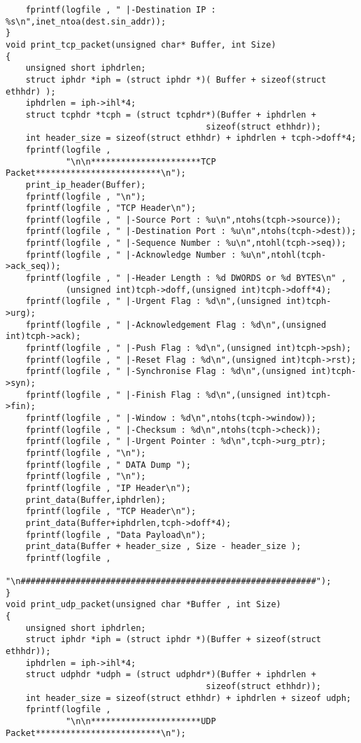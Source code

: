 \begin{verbatim}
    fprintf(logfile , " |-Destination IP : %s\n",inet_ntoa(dest.sin_addr));
}
void print_tcp_packet(unsigned char* Buffer, int Size)
{
    unsigned short iphdrlen;
    struct iphdr *iph = (struct iphdr *)( Buffer + sizeof(struct ethhdr) );
    iphdrlen = iph->ihl*4;
    struct tcphdr *tcph = (struct tcphdr*)(Buffer + iphdrlen + 
                                        sizeof(struct ethhdr));
    int header_size = sizeof(struct ethhdr) + iphdrlen + tcph->doff*4;
    fprintf(logfile , 
            "\n\n**********************TCP Packet*************************\n");
    print_ip_header(Buffer);
    fprintf(logfile , "\n");
    fprintf(logfile , "TCP Header\n");
    fprintf(logfile , " |-Source Port : %u\n",ntohs(tcph->source));
    fprintf(logfile , " |-Destination Port : %u\n",ntohs(tcph->dest));
    fprintf(logfile , " |-Sequence Number : %u\n",ntohl(tcph->seq));
    fprintf(logfile , " |-Acknowledge Number : %u\n",ntohl(tcph->ack_seq));
    fprintf(logfile , " |-Header Length : %d DWORDS or %d BYTES\n" ,
            (unsigned int)tcph->doff,(unsigned int)tcph->doff*4);
    fprintf(logfile , " |-Urgent Flag : %d\n",(unsigned int)tcph->urg);
    fprintf(logfile , " |-Acknowledgement Flag : %d\n",(unsigned int)tcph->ack);
    fprintf(logfile , " |-Push Flag : %d\n",(unsigned int)tcph->psh);
    fprintf(logfile , " |-Reset Flag : %d\n",(unsigned int)tcph->rst);
    fprintf(logfile , " |-Synchronise Flag : %d\n",(unsigned int)tcph->syn);
    fprintf(logfile , " |-Finish Flag : %d\n",(unsigned int)tcph->fin);
    fprintf(logfile , " |-Window : %d\n",ntohs(tcph->window));
    fprintf(logfile , " |-Checksum : %d\n",ntohs(tcph->check));
    fprintf(logfile , " |-Urgent Pointer : %d\n",tcph->urg_ptr);
    fprintf(logfile , "\n");
    fprintf(logfile , " DATA Dump ");
    fprintf(logfile , "\n");
    fprintf(logfile , "IP Header\n");
    print_data(Buffer,iphdrlen);
    fprintf(logfile , "TCP Header\n");
    print_data(Buffer+iphdrlen,tcph->doff*4);
    fprintf(logfile , "Data Payload\n");
    print_data(Buffer + header_size , Size - header_size );
    fprintf(logfile , 
            "\n###########################################################");
}
void print_udp_packet(unsigned char *Buffer , int Size)
{
    unsigned short iphdrlen;
    struct iphdr *iph = (struct iphdr *)(Buffer + sizeof(struct ethhdr));
    iphdrlen = iph->ihl*4;
    struct udphdr *udph = (struct udphdr*)(Buffer + iphdrlen + 
                                        sizeof(struct ethhdr));
    int header_size = sizeof(struct ethhdr) + iphdrlen + sizeof udph;
    fprintf(logfile , 
            "\n\n**********************UDP Packet*************************\n");

\end{verbatim}
